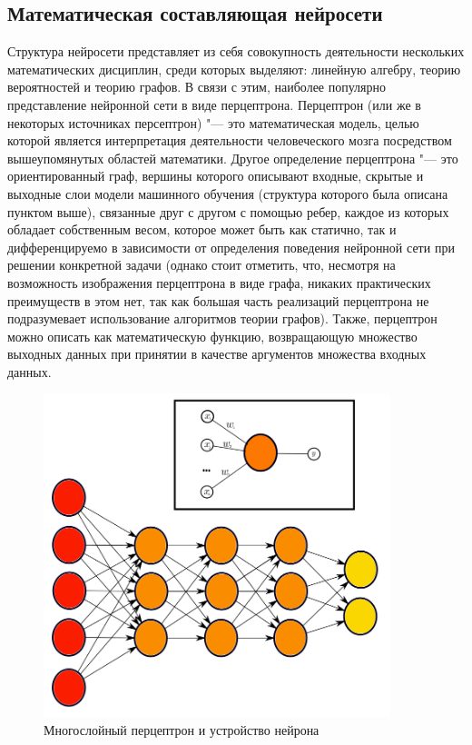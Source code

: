 \documentclass[bachelor, och, coursework]{SCWorks}
\begin{document}
    \subsection{Математическая составляющая нейросети}
        Структура нейросети представляет из себя совокупность деятельности нескольких математических дисциплин, среди которых выделяют: линейную алгебру, теорию вероятностей и теорию графов. В связи с этим, наиболее популярно представление нейронной сети в виде перцептрона. Перцептрон (или же в некоторых источниках персептрон) "--- это математическая модель, целью которой является интерпретация деятельности человеческого мозга посредством вышеупомянутых областей математики. Другое определение перцептрона "--- это ориентированный граф, вершины которого описывают входные, скрытые и выходные слои модели машинного обучения (структура которого была описана пунктом выше), связанные друг с другом с помощью ребер, каждое из которых обладает собственным весом, которое может быть как статично, так и дифференцируемо в зависимости от определения поведения нейронной сети при решении конкретной задачи (однако стоит отметить, что, несмотря на возможность изображения перцептрона в виде графа, никаких практических преимуществ в этом нет, так как большая часть реализаций перцептрона не подразумевает использование алгоритмов теории графов). Также, перцептрон можно описать как математическую функцию, возвращающую множество выходных данных при принятии в качестве аргументов множества входных данных.
        
        \begin{figure}[H]
            \centering
            \includegraphics[width=0.9\textwidth]{pic/perceptron.png}
            \caption{Многослойный перцептрон и устройство нейрона}
            \label{fig:img2}
        \end{figure}
        
\end{document}
